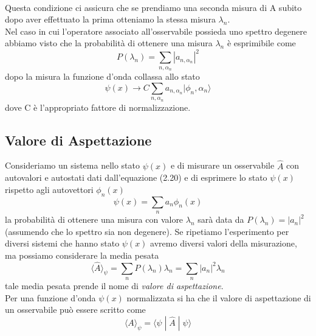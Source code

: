 \\
\noindent Questa condizione ci assicura che se prendiamo una seconda misura di A subito dopo aver effettuato la prima otteniamo la stessa misura $\lambda_n$.
\\
\noindent Nel caso in cui l'operatore associato all'osservabile possieda uno spettro degenere abbiamo visto che la probabilit\`a di ottenere una misura $\lambda_n$ \`e esprimibile come 
\begin{equation*}
	P(\lambda_n) = \sum_{n,\alpha_n} |a_{n,\alpha_n}|^2 
\end{equation*}
dopo la misura la funzione d'onda collassa allo stato
\begin{equation*}
	\psi(x) \to C \sum_{n,\alpha_n}a_{n,\alpha_n}|\phi_n,\alpha_n \rangle 
\end{equation*}
dove C \`e l'appropriato fattore di normalizzazione.

\subsection{Valore di Aspettazione}

Consideriamo un sistema nello stato $\psi(x)$ e di misurare un osservabile $\hat{A}$ con autovalori e autostati dati dall'equazione (2.20) e di esprimere lo stato $\psi(x)$ rispetto agli autovettori $\phi_n(x)$ 
\begin{equation*}
	\psi(x) = \sum_{n} a_n \phi_n(x)
\end{equation*}
la probabilit\`a di ottenere una misura con valore $\lambda_n$ sar\`a data da $P(\lambda_n) = |a_n|^2$
(assumendo che lo spettro sia non degenere). Se ripetiamo l'esperimento per diversi sistemi che hanno stato $\psi(x)$ avremo diversi valori della misurazione, ma possiamo considerare la media pesata 
\begin{equation}
	\langle \hat{A}\rangle_{\psi} = \sum_{n}P(\lambda_n)\lambda_n = \sum_{n}|a_n|^2 \lambda_n 
\end{equation}
tale media pesata prende il nome di \textit{valore di aspettazione}.
\\

\noindent Per una funzione d'onda $\psi(x)$ normalizzata si ha che il valore di aspettazione di un osservabile pu\`o essere scritto come 
\begin{equation}
	\langle A \rangle_{\psi} = \langle \psi \;|\;\hat{A} \;|\;\psi \rangle 
\end{equation}

